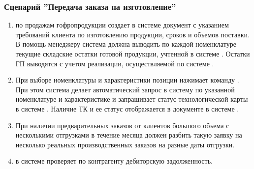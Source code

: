 \subsubsection{Сценарий ''Передача заказа на изготовление''}
\label{bp:sales_5}


\begin{enumerate}
\item \manager по продажам гофропродукции создает в системе \erp документ  с указанием требований клиента по изготовлению продукции, сроков и объемов поставки. В помощь менеджеру система \erp должна выводить по каждой номенклатуре текущие складские остатки готовой продукции, учтенной в системе \erp. Остатки ГП выводятся с учетом реализации, осуществляемой по системе \erp. 

\item При выборе номенклатуры и характеристики позиции \manager нажимает команду . При этом система \erp делает автоматический запрос в систему \gofro по указанной номенклатуре и характеристике и запрашивает статус технологической карты  в системе \gofro.
Наличие ТК и ее статус отображается в документе  в системе \erp.

\item	При наличии предварительных заказов от клиентов большого объема с несколькими отгрузками в течение месяца \manager должен разбить такую заявку на несколько реальных производственных заказов на разные даты отгрузки.
\item	\manager в системе \erp проверяет по контрагенту дебиторскую задолженность.


\end{enumerate}
